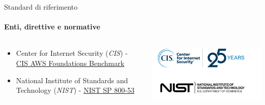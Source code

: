 \documentclass{beamer}
\newcommand{\hrefcol}[2]{\textcolor{cyan}{\href{#1}{#2}}}
\begin{document}
\begin{frame}{Standard di riferimento}
    \framesubtitle{Enti, direttive e normative}
    \begin{columns}
    \begin{column}{0.6\textwidth}
        \begin{itemize}
            \item Center for Internet Security (\emph{CIS}) -
                \hrefcol{https://www.cisecurity.org/}{CIS AWS Foundations Benchmark}
            \item National Institute of Standards and Technology (\emph{NIST}) - 
                \hrefcol{https://www.nist.gov/}{NIST SP 800-53}
        \end{itemize}
    \end{column}
    \begin{column}{0.4\textwidth}
    \includegraphics[width=\textwidth]{assets/cisnist.png}
    \end{column}
    \end{columns}
\end{frame}
\end{document}
